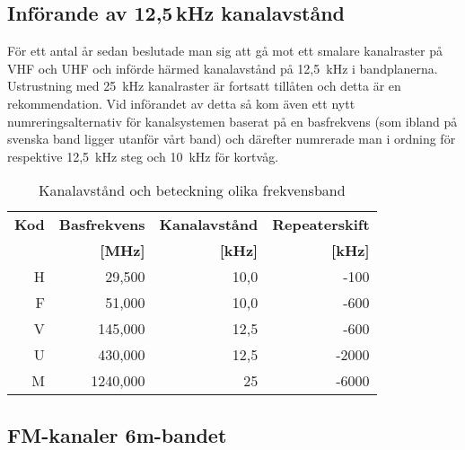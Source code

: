 \subsection{Införande av 12,5\,kHz kanalavstånd}

För ett antal år sedan beslutade man sig att gå mot ett smalare kanalraster på
VHF och UHF och införde härmed kanalavstånd på 12,5~kHz i bandplanerna.
Ustrustning med 25~kHz kanalraster är fortsatt tillåten och detta är en
rekommendation. Vid införandet av detta så kom även ett nytt
numreringsalternativ för kanalsystemen baserat på en basfrekvens (som ibland
på svenska band ligger utanför vårt band) och därefter numrerade man i ordning
för respektive 12,5~kHz steg och 10~kHz för kortvåg.

\begin{table}[h]
\centering
\begin{tabular}{rrrr}
	\bf Kod & \bf Basfrekvens & \bf Kanalavstånd & \bf Repeaterskift \\
	        &      \bf  [MHz] &        \bf [kHz] &         \bf [kHz] \\ \hline
	      H &          29,500 &             10,0 &              -100 \\
	      F &          51,000 &             10,0 &              -600 \\
	      V &         145,000 &             12,5 &              -600 \\
	      U &         430,000 &             12,5 &             -2000 \\
	      M &        1240,000 &               25 &             -6000
\end{tabular}
\label{tab:kanalavstand}
\caption{Kanalavstånd och beteckning olika frekvensband}
\end{table}

\subsection{FM-kanaler 6m-bandet}


